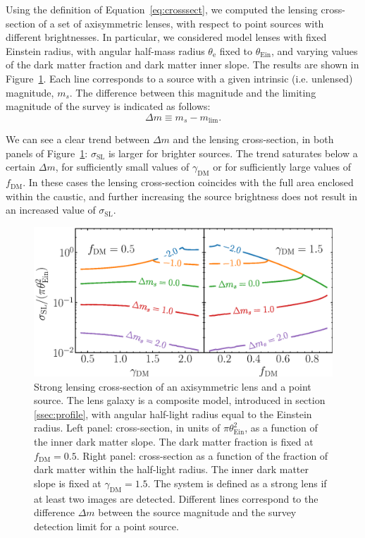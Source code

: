 \documentclass{aa}
\def\gammadm{\gamma_{\mathrm{DM}}}
\def\fdm{f_{\mathrm{DM}}}
\def\tein{\theta_{\mathrm{Ein}}}
\def\teff{\theta_{\mathrm{e}}}
\def\crosssect{\sigma_\mathrm{{SL}}}
\def\Fref#1{Figure~\ref{#1}\xspace}
\def\Eref#1{Equation~\ref{#1}\xspace}
\begin{document}
Using the definition of \Eref{eq:crosssect}, we computed the lensing cross-section of a set of axisymmetric lenses, with respect to point sources with different brightnesses.
In particular, we considered model lenses with fixed Einstein radius, with angular half-mass radius $\teff$ fixed to $\tein$, and varying values of the dark matter fraction and dark matter inner slope.
The results are shown in \Fref{fig:fixedap_cs}.
Each line corresponds to a source with a given intrinsic (i.e. unlensed) magnitude, $m_s$. The difference between this magnitude and the limiting magnitude of the survey is indicated as follows:
\begin{equation}
\Delta m \equiv m_s - m_{\mathrm{lim}}.
\end{equation}

We can see a clear trend between $\Delta m$ and the lensing cross-section, in both panels of \Fref{fig:fixedap_cs}: $\crosssect$ is larger for brighter sources.
The trend saturates below a certain $\Delta m$, for sufficiently small values of $\gammadm$ or for sufficiently large values of $\fdm$.
In these cases the lensing cross-section coincides with the full area enclosed within the caustic, and further increasing the source brightness does not result in an increased value of $\crosssect$.

\begin{figure}
\includegraphics[width=\columnwidth]{axisymm_composite_crosssect.eps}
\caption{
Strong lensing cross-section of an axisymmetric lens and a point source.
The lens galaxy is a composite model, introduced in section \ref{ssec:profile}, with angular half-light radius equal to the Einstein radius.
Left panel: cross-section, in units of $\pi\tein^2$, as a function of the inner dark matter slope. The dark matter fraction is fixed at $\fdm=0.5$.
Right panel: cross-section as a function of the fraction of dark matter within the half-light radius. The inner dark matter slope is fixed at $\gammadm=1.5$.
The system is defined as a strong lens if at least two images are detected.
Different lines correspond to the difference $\Delta m$ between the source magnitude and the survey detection limit for a point source.
\label{fig:fixedap_cs}
}
\end{figure}
\end{document}
